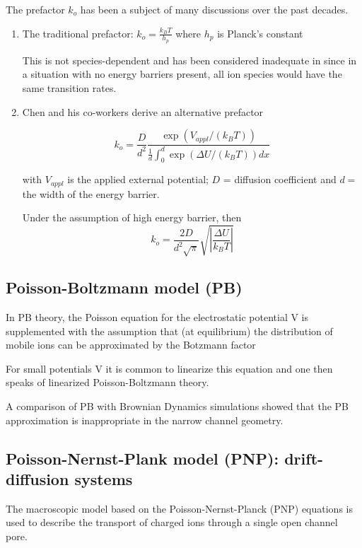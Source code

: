 The prefactor $k_o$ has been a subject of many discussions over the past
decades.
\begin{enumerate}
  \item The traditional prefactor: $k_o = \frac{k_BT}{h_p}$ where $h_p$ is
  Planck's constant

This is not species-dependent and has been considered inadequate in
since in a situation with no energy barriers present, all ion species would have
the same transition rates.

  \item Chen and his co-workers derive an alternative prefactor

\begin{equation}
k_o = \frac{D}{d^2} \frac{\exp(V_{appl}/(k_BT))}{\frac{1}{d} \int^d_0
\exp(\Delta U/(k_BT)) dx}
\end{equation}

with $V_{appl}$ is the applied external potential; $D$ = diffusion
coefficient and $d=	$ the width of the energy barrier.


Under the assumption of high energy barrier, then
\begin{equation}
k_o = \frac{2D}{d^2\sqrt{\pi}} \sqrt{|\frac{\Delta U}{k_BT}|}
\end{equation}
\end{enumerate}


\subsection{Poisson-Boltzmann model (PB)}
\label{sec:Poisson-Boltzmann-model}

In PB theory, the Poisson equation for the electrostatic potential V is
supplemented with the assumption that (at equilibrium) the distribution of
mobile ions can be approximated by the Botzmann factor

For small potentials V it is common to linearize this equation and one then
speaks of linearized Poisson-Boltzmann theory.

A comparison of PB with Brownian Dynamics simulations showed that the
PB approximation is inappropriate in the narrow channel geometry.

\subsection{Poisson-Nernst-Plank model (PNP): drift-diffusion systems}
\label{sec:Poisson-Nernst-Plank-model}

The macroscopic model based on the Poisson-Nernst-Planck (PNP) equations is used to
describe the transport of charged ions through a single open channel pore.

